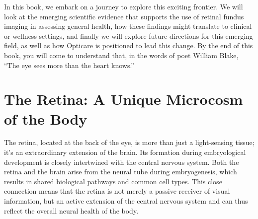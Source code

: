 \documentclass[
  Letterpaper,
]{scrbook}
\begin{document}
In this book, we embark on a journey to explore this exciting frontier.
We will look at the emerging scientific evidence that supports the use
of retinal fundus imaging in assessing general health, how these
findings might translate to clinical or wellness settings, and finally
we will explore future directions for this emerging field, as well as
how Opticare is positioned to lead this change. By the end of this book,
you will come to understand that, in the words of poet William Blake,
``The eye sees more than the heart knows.''

\section{The Retina: A Unique Microcosm of the
Body}\label{the-retina-a-unique-microcosm-of-the-body}

The retina, located at the back of the eye, is more than just a
light-sensing tissue; it's an extraordinary extension of the brain. Its
formation during embryological development is closely intertwined with
the central nervous system. Both the retina and the brain arise from the
neural tube during embryogenesis, which results in shared biological
pathways and common cell types. This close connection means that the
retina is not merely a passive receiver of visual information, but an
active extension of the central nervous system and can thus reflect the
overall neural health of the body.
\end{document}
